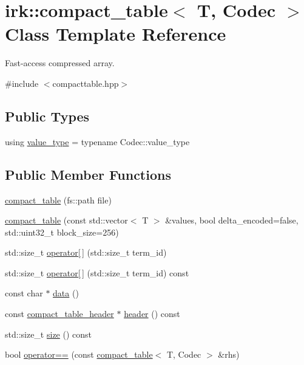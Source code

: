\hypertarget{classirk_1_1compact__table}{}\section{irk\+:\+:compact\+\_\+table$<$ T, Codec $>$ Class Template Reference}
\label{classirk_1_1compact__table}


Fast-\/access compressed array.  




{\ttfamily \#include $<$compacttable.\+hpp$>$}

\subsection*{Public Types}
\begin{DoxyCompactItemize}
\item 
using \mbox{\hyperlink{classirk_1_1compact__table_a1c0c667110b82f790a0c0088e53ff461}{value\+\_\+type}} = typename Codec\+::value\+\_\+type
\end{DoxyCompactItemize}
\subsection*{Public Member Functions}
\begin{DoxyCompactItemize}
\item 
\mbox{\hyperlink{classirk_1_1compact__table_a7a5ea0a767cf151a37639532e36712f3}{compact\+\_\+table}} (fs\+::path file)
\item 
\mbox{\hyperlink{classirk_1_1compact__table_a3400a8843f4c286fd49417eeca2c9e74}{compact\+\_\+table}} (const std\+::vector$<$ T $>$ \&values, bool delta\+\_\+encoded=false, std\+::uint32\+\_\+t block\+\_\+size=256)
\item 
std\+::size\+\_\+t \mbox{\hyperlink{classirk_1_1compact__table_a7b0ae00675c32fcc1e7804f1ad3ab3ad}{operator\mbox{[}$\,$\mbox{]}}} (std\+::size\+\_\+t term\+\_\+id)
\item 
std\+::size\+\_\+t \mbox{\hyperlink{classirk_1_1compact__table_ac80ecca694d256e4f3c5c29e98900ccc}{operator\mbox{[}$\,$\mbox{]}}} (std\+::size\+\_\+t term\+\_\+id) const
\item 
const char $\ast$ \mbox{\hyperlink{classirk_1_1compact__table_a33d2d55685fe583f89521c2ca9797973}{data}} ()
\item 
const \mbox{\hyperlink{structirk_1_1compact__table__header}{compact\+\_\+table\+\_\+header}} $\ast$ \mbox{\hyperlink{classirk_1_1compact__table_ac5b6d8b0f58abd180ebd0d57396aa7ac}{header}} () const
\item 
std\+::size\+\_\+t \mbox{\hyperlink{classirk_1_1compact__table_adb0104bee02709980c7a7f9cd3a7719e}{size}} () const
\item 
bool \mbox{\hyperlink{classirk_1_1compact__table_ae2947a995621e70e7e7c533e30a0e043}{operator==}} (const \mbox{\hyperlink{classirk_1_1compact__table}{compact\+\_\+table}}$<$ T, Codec $>$ \&rhs)
\end{DoxyCompactItemize}
